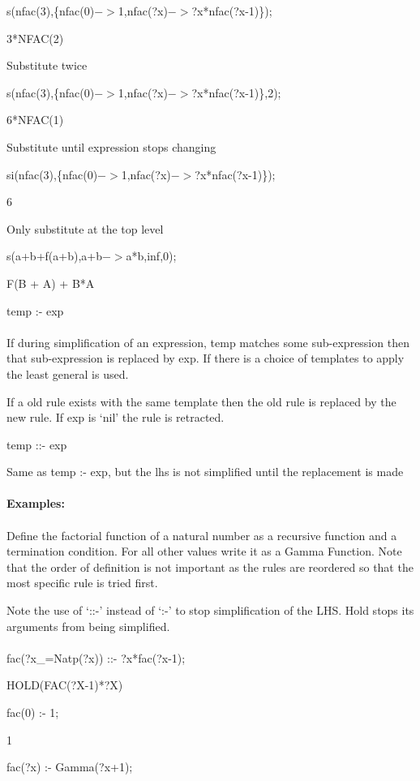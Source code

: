 \documentclass{article}
\begin{document}
 s(nfac(3),\{nfac(0)$->$1,nfac(?x)$->$?x{*}nfac(?x-1)\});

 3{*}NFAC(2)


Substitute twice

 s(nfac(3),\{nfac(0)$->$1,nfac(?x)$->$?x{*}nfac(?x-1)\},2);

 6{*}NFAC(1)


Substitute until expression stops changing

 si(nfac(3),\{nfac(0)$->$1,nfac(?x)$->$?x{*}nfac(?x-1)\});

 6


Only substitute at the top level

 s(a+b+f(a+b),a+b$->$a{*}b,inf,0);

 F(B + A) + B{*}A


temp :- exp \\
\ \\
If during simplification of an expression, temp matches some
sub-expression then that sub-expression is replaced by exp. If there is
a choice of templates to apply the least general is used.

If a old rule exists with the same template then the old rule is
replaced by the new rule. If exp is `nil' the rule is retracted.



temp ::- exp


Same as temp :- exp, but the lhs is not simplified until the replacement
is made \\
\ \\
{\bf Examples:} \\
\ \\
Define the factorial function of a natural number as a recursive function
and a termination condition. For all other values write it as a Gamma
Function. Note that the order of definition is not important as the rules
are reordered so that the most specific rule is tried first.

Note the use of `::-' instead of `:-' to stop simplification of
the LHS. Hold stops its arguments from being simplified. \\
\ \\
 fac(?x\_=Natp(?x)) ::- ?x{*}fac(?x-1);

 HOLD(FAC(?X-1){*}?X)



 fac(0) :- 1;

 1



 fac(?x) :- Gamma(?x+1);
\end{document}
